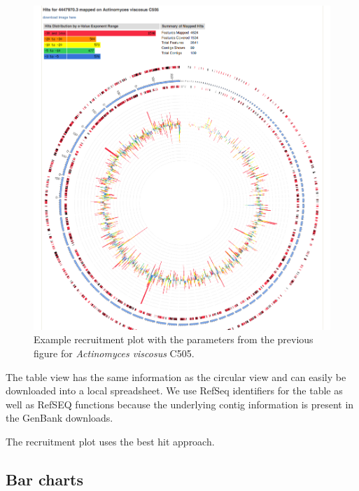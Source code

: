 \documentclass[12pt,fullpage]{report}
\begin{document}
\begin{figure}
\begin{center}
\includegraphics[width=6in]{Images/analysis-page-recruitment-plot-example.png}
\end{center}
\caption{
Example recruitment plot with the parameters from the previous figure for \textit{Actinomyces viscosus} C505.
}
\label{fig:analysis-page-recruitment-plot-example}
\end{figure}


The table view has the same information as the circular view and can easily be downloaded into a local spreadsheet. We use RefSeq\cite{REFSEQ} identifiers for the table as well as RefSEQ functions because the underlying contig information is present in the GenBank\cite{GENBANK} downloads.

The recruitment plot uses the best hit approach.

\subsection{Bar charts}
\label{section:bar-charts}
\end{document}
